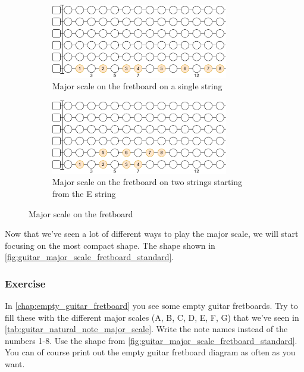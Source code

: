 \begin{figure}[h]
	\vspace{0.5cm}
	\begin{subfigure}[b]{\textwidth}
		\centering
		\includegraphics[width=0.85\textwidth]{../../Images/guitar_major_scale_single_string.png}
		\caption{Major scale on the fretboard on a single string}
		\label{fig:guitar_major_scale_fretboard_single_string}
	\end{subfigure}
	
	\vspace{0.5cm}
	\begin{subfigure}[b]{\textwidth}
		\centering
		\includegraphics[width=0.85\textwidth]{../../Images/guitar_major_scale_double_string_from_e.png}
		\caption{Major scale on the fretboard on two strings starting from the E string}
		\label{fig:guitar_major_scale_fretboard_double_string_from_e}
	\end{subfigure}
	
	\caption{Major scale on the fretboard}
	\label{fig:guitar_major_scale_fretboard}
\end{figure}

\newpage

Now that we've seen a lot of different ways to play the major scale, we will start focusing on the most compact shape. The shape shown in \autoref{fig:guitar_major_scale_fretboard_standard}.

\subsubsection{Exercise}

In \autoref{chap:empty_guitar_fretboard} you see some empty guitar fretboards. Try to fill these with the different major scales (A, B, C, D, E, F, G) that we've seen in \autoref{tab:guitar_natural_note_major_scale}. Write the note names instead of the numbers 1-8. Use the shape from \autoref{fig:guitar_major_scale_fretboard_standard}. You can of course print out the empty guitar fretboard diagram as often as you want.

